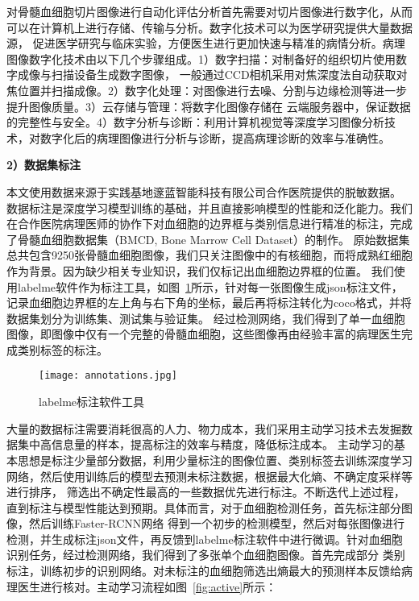 对骨髓血细胞切片图像进行自动化评估分析首先需要对切片图像进行数字化\cite{fuxinyan2022}，从而可以在计算机上进行存储、传输与分析。数字化技术可以为医学研究提供大量数据源，
促进医学研究与临床实验，方便医生进行更加快速与精准的病情分析。病理图像数字化技术由以下几个步骤组成。1）数字扫描：对制备好的组织切片使用数字成像与扫描设备生成数字图像，
一般通过CCD相机采用对焦深度法自动获取对焦位置并扫描成像。2）数字化处理：对图像进行去噪、分割与边缘检测等进一步提升图像质量。3）云存储与管理：将数字化图像存储在
云端服务器中，保证数据的完整性与安全。4）数字分析与诊断：利用计算机视觉等深度学习图像分析技术，对数字化后的病理图像进行分析与诊断，提高病理诊断的效率与准确性。

\textbf{2）数据集标注}

本文使用数据来源于实践基地邃蓝智能科技有限公司合作医院提供的脱敏数据。
数据标注是深度学习模型训练的基础，并且直接影响模型的性能和泛化能力。我们在合作医院病理医师的协作下对血细胞的边界框与类别信息进行精准的标注，完成了骨髓血细胞数据集（BMCD, Bone Marrow Cell Dataset）的制作。
原始数据集总共包含9250张骨髓血细胞图像，我们只关注图像中的有核细胞，而将成熟红细胞作为背景。因为缺少相关专业知识，我们仅标记出血细胞边界框的位置。
我们使用labelme软件作为标注工具，如图~\ref{fig:annotations}所示，针对每一张图像生成json标注文件，记录血细胞边界框的左上角与右下角的坐标，最后再将标注转化为coco格式，并将数据集划分为训练集、测试集与验证集。
经过检测网络，我们得到了单一血细胞图像，即图像中仅有一个完整的骨髓血细胞，这些图像再由经验丰富的病理医生完成类别标签的标注。

\begin{figure}[htbp]
  \centering
  \texttt{[image: annotations.jpg]}
  \caption{labelme标注软件工具}
  \label{fig:annotations}
\end{figure}

大量的数据标注需要消耗很高的人力、物力成本，我们采用主动学习\cite{ren2021survey}技术去发掘数据集中高信息量的样本，提高标注的效率与精度，降低标注成本。
主动学习的基本思想是标注少量部分数据，利用少量标注的图像位置、类别标签去训练深度学习网络，然后使用训练后的模型去预测未标注数据，根据最大化熵、不确定度采样等进行排序，
筛选出不确定性最高的一些数据优先进行标注。不断迭代上述过程，直到标注与模型性能达到预期。具体而言，对于血细胞检测任务，首先标注部分图像，然后训练Faster-RCNN网络
得到一个初步的检测模型，然后对每张图像进行检测，并生成标注json文件，再反馈到labelme标注软件中进行微调。针对血细胞识别任务，经过检测网络，我们得到了多张单个血细胞图像。首先完成部分
类别标注，训练初步的识别网络。对未标注的血细胞筛选出熵最大的预测样本反馈给病理医生进行核对。主动学习流程如图~\ref{fig:active}所示：

